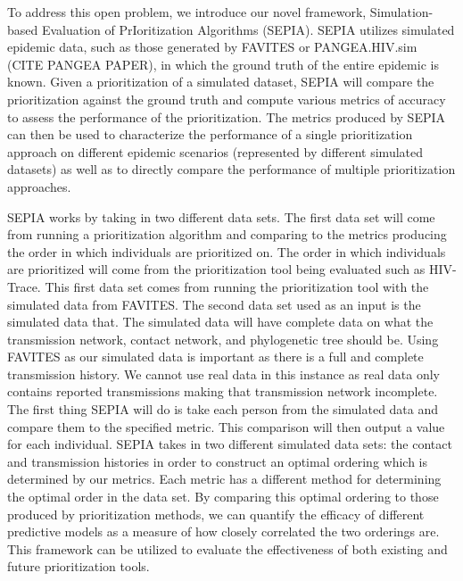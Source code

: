 \documentclass[twocolumn]{bmcart}%
\begin{document}
\begin{multicols}
To address this open problem, we introduce our novel framework, Simulation-based Evaluation of PrIoritization Algorithms (SEPIA). SEPIA utilizes simulated epidemic data, such as those generated by FAVITES \cite{moshiri2018favites} or PANGEA.HIV.sim (CITE PANGEA PAPER), in which the ground truth of the entire epidemic is known. Given a prioritization of a simulated dataset, SEPIA will compare the prioritization against the ground truth and compute various metrics of accuracy to assess the performance of the prioritization. The metrics produced by SEPIA can then be used to characterize the performance of a single prioritization approach on different epidemic scenarios (represented by different simulated datasets) as well as to directly compare the performance of multiple prioritization approaches.

SEPIA works by taking in two different data sets. The first data set will come from running a prioritization algorithm and comparing to the metrics producing the order in which individuals are prioritized on. The order in which individuals are prioritized will come from the prioritization tool being evaluated such as HIV-Trace. This first data set comes from running the prioritization tool with the simulated data from FAVITES. The second data set used as an input is the simulated data that. The simulated data will have complete data on what the transmission network, contact network, and phylogenetic tree should be. Using FAVITES as our simulated data is important as there is a full and complete transmission history. We cannot use real data in this instance as real data only contains reported transmissions making that transmission network incomplete. The first thing SEPIA will do is take each person from the simulated data and compare them to the specified metric. This comparison will then output a value for each individual. SEPIA takes in two different simulated data sets: the contact and transmission histories in order to construct an optimal ordering which is determined by our metrics. Each metric has a different method for determining the optimal order in the data set. By comparing this optimal ordering to those produced by prioritization methods, we can quantify the efficacy of different predictive models as a measure of how closely correlated the two orderings are. This framework can be utilized to evaluate the effectiveness of both existing and future prioritization tools.


\end{multicols}
\end{document}
